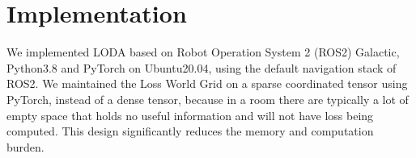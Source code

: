 \section{Implementation}

We implemented LODA based on Robot Operation System 2 (ROS2) Galactic, Python3.8 and PyTorch on Ubuntu20.04, using the default navigation stack of ROS2.
We maintained the Loss World Grid on a sparse coordinated tensor using PyTorch, instead of a dense tensor, because in a room there are typically a lot of empty space that holds no useful information and will not have loss being computed.
This design significantly reduces the memory and computation burden.

